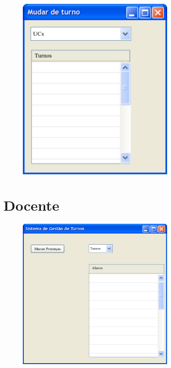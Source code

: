 \documentclass[12pt,a4paper]{report}
\begin{document}
\begin{appendices}
\begin{figure}[H]
	\centering 
	\includegraphics[width=0.7\textwidth]{modelacao/mockups/alunoemudarturno.png}
\end{figure}


\section{Docente}
\begin{figure}[H]
	\centering 
	\includegraphics[width=0.7\textwidth]{modelacao/mockups/docente.png}  
\end{figure}


\end{appendices}
\end{document}
